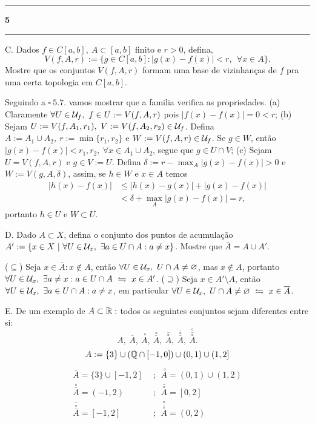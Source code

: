   {\hrule \vspace{-0.15cm}
  \centering \textbf{5} \vspace{0.1cm}
  \hrule}

C. Dados \(f \in C[a,b], \ A \subset [a,b]\) finito e \(r>0\), defina, 
\[V(f, A, r):= \{ g \in C[a,b] : |g(x) - f(x)| < r, \ \ \forall x \in A\}.\]
Mostre que os conjuntos \(V(f, A, r)\) formam uma base de vizinhanças de \(f\) pra uma certa topologia em \(C[a,b]\). 

\textcolor{gris}{Seguindo a \(\square \ 5.7.\) vamos mostrar que a familia verifica as propriedades. (a) Claramente \(\forall U \in \mathcal{U}_f, \ f \in U := V(f,A,r)\) pois \(|f(x) - f(x)| = 0 < r\); (b) Sejam \(U:= V(f, A_1, r_1), \ V := V(f, A_2, r_2) \in \mathcal{U}_f\). Defina \(A:= A_1 \cup A_2, \ r := \min \{r_1, r_2\}\) e \(W:= V(f, A, r) \in \mathcal{U}_f\). Se \(g \in W\), então \(|g(x) - f(x)|< r_1, r_2, \ \forall x \in A_1 \cup A_2\), segue que \(g \in U \cap V\); (c) Sejam \(U = V(f,A,r)\) e \(g \in V:= U\). Defina \(\delta := r - \max_A |g(x)-f(x)| > 0\) e \(W := V(g,A,\delta)\), assim, se \(h \in W\) e \(x\in A\) temos 
\begin{align*}
  |h(x) - f(x) | &\leq |h(x)- g(x)| + |g(x)-f(x)|\\ 
  &< \delta + \max_A |g(x) - f(x)|  = r,  
\end{align*} 
portanto \(h \in U \) e \(W \subset U\).   
}

D. Dado \(A \subset X\), defina o conjunto dos puntos de acumulação \(A' := \{x \in X \ | \  \forall U \in \mathcal{U}_x, \ \exists a \in U\cap A  : a \neq x\}\). Mostre que \(\overline{A} = A \cup A'\).  

\textcolor{gris}{(\(\subseteq \)) Seja \(x \in \overline{A}: x \notin A\), então \(\forall U \in \mathcal{U}_x, \ U\cap A \neq \varnothing \), mas \(x \notin A\), portanto \(\forall U \in \mathcal{U}_x, \ \exists a \neq x : a \in U\cap A \ \leftrightharpoons \ x \in A'\). (\(\supseteq \)) Seja \(x \in A' \setminus A\), então  \(\forall U \in \mathcal{U}_x, \ \exists a \in U \cap A : a \neq x\), em particular \(\forall U \in \U_x, \ U \cap A \neq \varnothing \ \leftrightharpoons \ x \in \overline{A}\).  }

E. De um exemplo de \(A \subset \mathbb{R} : \) todos os seguintes conjuntos sejam diferentes entre si: 
\[A, \ \overline{A}, \ \overset{\ \circ}{A}, \ \overset{ \circ }{\overline{A}},  \ \overline{\overset{ \circ}{A}}, \ \overline{ \overset{ \circ }{\overline{A}} }, \ \overset{\circ }{ \overline{\overset{ \circ}{A}} }.\]
\- \vspace{-0.3cm}
\textcolor{gris}{\[A:= \{3\} \cup (\mathbb{Q} \cap [-1,0]) \cup (0,1) \cup (1,2]\]
\begin{align*}
  \overline{A} = \{3\} \cup [-1,2] \ \ &; \ \ \overset{\ \circ}{A} = (0,1)\cup (1,2) \\ 
\overset{ \circ }{\overline{A}}= (-1,2)\ \  &; \ \ \overline{\overset{ \circ}{A}} = [0,2]\\ 
\overline{ \overset{ \circ }{\overline{A}} } =  [-1,2]\ \ &; \ \ \overset{\circ }{ \overline{\overset{\circ}{A}}  }= (0,2)
\end{align*}
}

